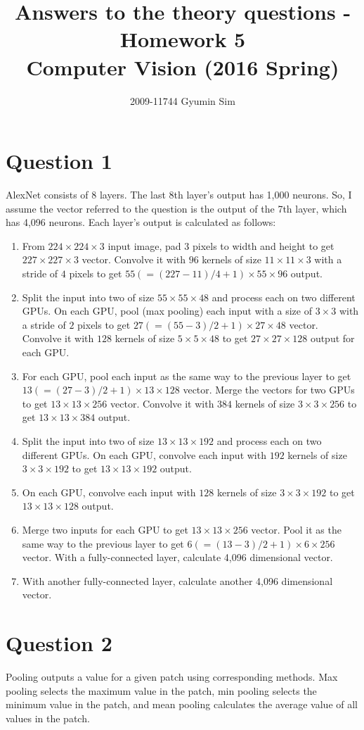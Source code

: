\documentclass[a4paper,10pt]{article}
\begin{document}
\title{Answers to the theory questions - Homework 5 \\
  \large Computer Vision (2016 Spring)}
\author{2009-11744 Gyumin Sim}
\maketitle

\section*{Question 1}

AlexNet consists of 8 layers.
The last 8th layer's output has 1,000 neurons.
So, I assume the vector referred to the question is the output of the 7th layer, which has 4,096 neurons.
Each layer's output is calculated as follows:
\begin{enumerate}
\item From $224 \times 224 \times 3$ input image, pad $3$ pixels to width and height to get $227 \times 227 \times 3$ vector.
Convolve it with $96$ kernels of size $11 \times 11 \times 3$ with a stride of $4$ pixels to get $55 (= (227-11)/4+1) \times 55 \times 96$ output.
\item Split the input into two of size $55 \times 55 \times 48$ and process each on two different GPUs.
On each GPU, pool (max pooling) each input with a size of $3 \times 3$ with a stride of $2$ pixels to get $27 (= (55-3)/2+1) \times 27 \times 48$ vector.
Convolve it with $128$ kernels of size $5 \times 5 \times 48$ to get $27 \times 27 \times 128$ output for each GPU.
\item For each GPU, pool each input as the same way to the previous layer to get $13 (= (27-3)/2+1) \times 13 \times 128$ vector.
Merge the vectors for two GPUs to get $13 \times 13 \times 256$ vector.
Convolve it with $384$ kernels of size $3 \times 3 \times 256$ to get $13 \times 13 \times 384$ output.
\item Split the input into two of size $13 \times 13 \times 192$ and process each on two different GPUs.
On each GPU, convolve each input with $192$ kernels of size $3 \times 3 \times 192$ to get $13 \times 13 \times 192$ output.
\item On each GPU, convolve each input with $128$ kernels of size $3 \times 3 \times 192$ to get $13 \times 13 \times 128$ output.
\item Merge two inputs for each GPU to get $13 \times 13 \times 256$ vector.
Pool it as the same way to the previous layer to get $6 (= (13-3)/2+1) \times 6 \times 256$ vector.
With a fully-connected layer, calculate 4,096 dimensional vector.
\item With another fully-connected layer, calculate another 4,096 dimensional vector.
\end{enumerate}

\section*{Question 2}

Pooling outputs a value for a given patch using corresponding methods.
Max pooling selects the maximum value in the patch,
min pooling selects the minimum value in the patch,
and mean pooling calculates the average value of all values in the patch.
\end{document}
